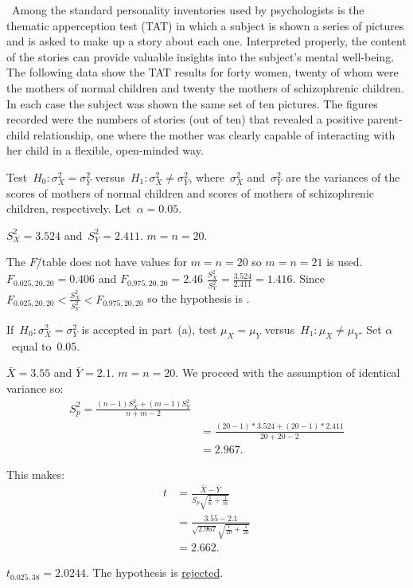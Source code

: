 \begin{problem}
  ~Among the standard personality inventories used by psychologists is the thematic apperception test (TAT) in which a subject is shown a series of pictures and is asked to make up a story about each one. Interpreted properly, the content of the stories can provide valuable insights into the subject’s mental well-being. The following data show the TAT results for forty women, twenty of whom were the mothers of normal children and twenty the mothers of schizophrenic children. In each case the subject was shown the same set of ten pictures. The figures recorded were the numbers of stories (out of ten) that revealed a positive parent-child relationship, one where the mother was clearly capable of interacting with her child in a flexible, open-minded way.
\end{problem}

\begin{subproblem}
  Test~${H_0 : \sigma_{X}^{2} = \sigma_{Y}^{2}}$ versus~${H_1 : \sigma_{X}^{2} \ne \sigma_{Y}^{2}}$, where~$\sigma_{X}^2$ and~$\sigma_{Y}^{2}$ are the variances of the scores of mothers of normal children and scores of mothers of schizophrenic children, respectively. Let~${\alpha = 0.05}$.
\end{subproblem}

${S^{2}_{X} = 3.524}$ and~${S^{2}_Y = 2.411}$.  ${m = n = 20}$.

The $F$\=/table does not have values for ${m = n = 20}$ so ${m = n = 21}$ is used. ${F_{0.025,20,20} = 0.406}$ and ${F_{0.975,20,20} = 2.46}$  ${\frac{S^{2}_{X}}{S^{2}_{Y}} = \frac{3.524}{2.411} = 1.416}$.  Since ${F_{0.025,20,20} < \frac{S^{2}_{X}}{S^{2}_{Y}} < F_{0.975,20,20}}$ so the hypothesis is .

\begin{subproblem}
  If~${H_0: \sigma_{X}^{2} = \sigma_{Y}^{2}}$ is accepted in part~(a), test ${\mu_{X} = \mu_{Y}}$ versus~${H_{1}: \mu_{X} \ne \mu_{Y}}$. Set $\alpha$~equal to~0.05.
\end{subproblem}

${\bar{X} = 3.55}$ and ${\bar{Y} = 2.1}$.  ${m = n = 20}$.  We proceed with the assumption of identical variance so:
\begin{align}
  S^{2}_{p} = \frac{(n-1)S^{2}_{X} + (m-1)S^{2}_{Y}}{n + m - 2} \\
            &= \frac{(20 - 1) * 3.524+ (20 - 1) * 2.411}{20 + 20 - 2} \\
            &= 2.967 \text{.}
\end{align}

This makes:
\begin{align}
  t &= \frac{\bar{X} - \bar{Y}}{S_{p} \sqrt{\frac{1}{n} + \frac{1}{m}}} \\
    &=  \frac{3.55 - 2.1}{\sqrt{2.967} \sqrt{\frac{1}{20} + \frac{1}{20}}} \\
    &= 2.662\text{.}
\end{align}

${t_{0.025,38} = 2.0244}$.  The hypothesis is \underline{rejected}.
